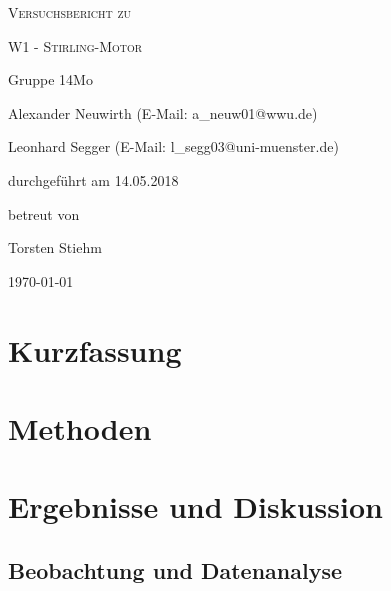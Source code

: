 \documentclass[
	a4paper,
	12pt,
	pagesize,
	ngerman
]{scrartcl}
\begin{document}
	
	\begin{titlepage}
		\centering
		{\scshape\LARGE Versuchsbericht zu \par}
		\vspace{1cm}
		{\scshape\huge W1 - Stirling-Motor \par} 
		\vspace{2.5cm}
		{\LARGE Gruppe 14Mo \par}
		\vspace{0.5cm}
		
		{\large Alexander Neuwirth (E-Mail: a\_neuw01@wwu.de) \par}
		{\large Leonhard Segger (E-Mail: l\_segg03@uni-muenster.de) \par}
		\vfill
		
		durchgeführt am 14.05.2018\par 
		betreut von\par
		{\large Torsten Stiehm} 
		
		\vfill
		
		{\large \today\par}
	\end{titlepage}
	\tableofcontents
	\newpage

	\section{Kurzfassung}
	
	\section{Methoden} \label{sec_Methoden}
	
	
	\section{Ergebnisse und Diskussion}
	

	\subsection{Beobachtung und Datenanalyse}
	
\end{document}
